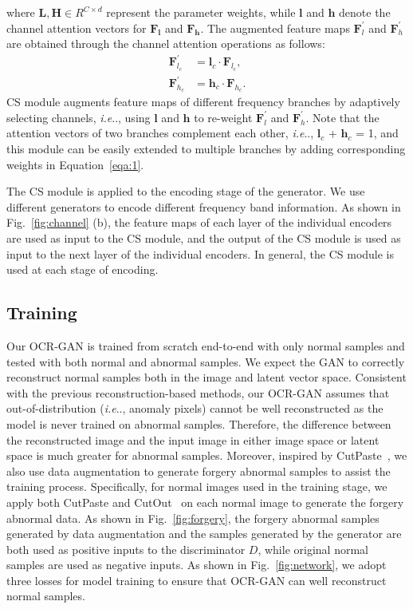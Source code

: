 \documentclass[lettersize,journal]{IEEEtran}
\makeatletter
\DeclareRobustCommand\onedot{\futurelet\@let@token\@onedot}
\def\@onedot{\ifx\@let@token.\else.\null\fi\xspace}
\def\ie{\emph{i.e}\onedot} \def\Ie{\emph{I.e}\onedot}
\makeatother
\begin{document}
where $\bm{L}, \bm{H} \in {R}^{C\times d}$ represent the parameter weights, while $\bm{l}$ and $\bm{h}$ denote the channel attention vectors for $\bm{F_l}$ and $\bm{F_h}$. The augmented feature maps $\bm{F}_l^{'}$ and $\bm{F}_h^{'}$ are obtained through the channel attention operations as follows:
\begin{equation}
\begin{aligned}
    \bm{F}^{'}_{l_c} &= \bm{l}_c \cdot \bm{F}_{l_c},\\
    \bm{F}^{'}_{h_c} &= \bm{h}_c \cdot \bm{F}_{h_c}.
\end{aligned}
\end{equation}
CS module augments feature maps of different frequency branches by adaptively selecting channels, \ie, using $\bm{l}$ and $\bm{h}$ to re-weight $\bm{F}_l^{'}$ and $\bm{F}_h^{'}$. Note that the attention vectors of two branches complement each other, \ie, $\bm{l}_c$ + $\bm{h}_c$ = 1, and this module can be easily extended to multiple branches by adding corresponding weights in Equation~\ref{eqa:1}. 

The CS module is applied to the encoding stage of the generator. We use different generators to encode different frequency band information. As shown in Fig.~\ref{fig:channel} (b), the feature maps of each layer of the individual encoders are used as input to the CS module, and the output of the CS module is used as input to the next layer of the individual encoders. In general, the CS module is used at each stage of encoding.

\subsection{Training}
Our OCR-GAN is trained from scratch end-to-end with only normal samples and tested with both normal and abnormal samples. We expect the GAN to correctly reconstruct normal samples both in the image and latent vector space. Consistent with the previous reconstruction-based methods, our OCR-GAN assumes that out-of-distribution (\ie, anomaly pixels) cannot be well reconstructed as the model is never trained on abnormal samples. Therefore, the difference between the reconstructed image and the input image in either image space or latent space is much greater for abnormal samples. Moreover, inspired by CutPaste~\cite{li2021cutpaste}, we also use data augmentation to generate forgery abnormal samples to assist the training process. Specifically, for normal images used in the training stage, we apply both CutPaste and CutOut~\cite{cutout} on each normal image to generate the forgery abnormal data. As shown in Fig.~\ref{fig:forgery}, the forgery abnormal samples generated by data augmentation and the samples generated by the generator are both used as positive inputs to the discriminator $D$, while original normal samples are used as negative inputs. As shown in Fig.~\ref{fig:network}, we adopt three losses for model training to ensure that OCR-GAN can well reconstruct normal samples.
\end{document}

